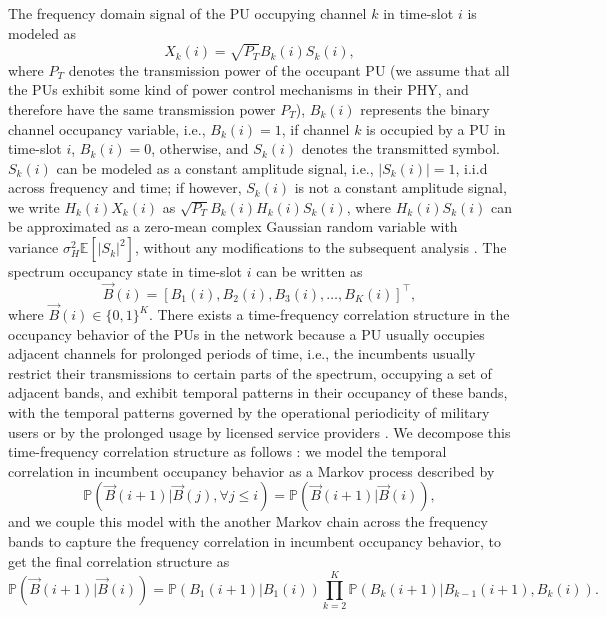 \documentclass[12pt, draftcls, onecolumn]{IEEEtran}
\begin{document}
The frequency domain signal of the PU occupying channel $k$ in time-slot $i$ is modeled as
\begin{equation}\label{3}
    X_{k}(i)=\sqrt{P_{T}}B_{k}(i)S_{k}(i),
\end{equation}
where $P_{T}$ denotes the transmission power of the occupant PU (we assume that all the PUs exhibit some kind of power control mechanisms in their PHY, and therefore have the same transmission power $P_{T}$), $B_{k}(i)$ represents the binary channel occupancy variable, i.e., $B_{k}(i){=}1$, if channel $k$ is occupied by a PU in time-slot $i$, $B_{k}(i){=}0$, otherwise, and $S_{k}(i)$ denotes the transmitted symbol. $S_{k}(i)$ can be modeled as a constant amplitude signal, i.e., $|S_{k}(i)|{=}1$, i.i.d across frequency and time; if however, $S_{k}(i)$ is not a constant amplitude signal, we write $H_{k}(i)X_{k}(i)$ as $\sqrt{P_{T}}B_{k}(i)H_{k}(i)S_{k}(i)$, where $H_{k}(i)S_{k}(i)$ can be approximated as a zero-mean complex Gaussian random variable with variance $\sigma_{H}^{2}\mathbb{E}[|S_{k}|^{2}]$, without any modifications to the subsequent analysis \cite{WCL:paper}. The spectrum occupancy state in time-slot $i$ can be written as
\begin{equation}\label{4}
    \vec{B}(i)=[B_{1}(i),B_{2}(i),B_{3}(i),\dots,B_{K}(i)]^{\intercal},
\end{equation}
where $\vec{B}(i){\in}\{0,1\}^{K}$. There exists a time-frequency correlation structure in the occupancy behavior of the PUs in the network because a PU usually occupies adjacent channels for prolonged periods of time, i.e., the incumbents usually restrict their transmissions to certain parts of the spectrum, occupying a set of adjacent bands, and exhibit temporal patterns in their occupancy of these bands, with the temporal patterns governed by the operational periodicity of military users or by the prolonged usage by licensed service providers \cite{WCL:12}. We decompose this time-frequency correlation structure as follows \cite{WCL:paper}: we model the temporal correlation in incumbent occupancy behavior as a Markov process described by
\begin{equation}\label{5}
    \mathbb{P}(\vec{B}(i+1)|\vec{B}(j),\forall j \leq i)=\mathbb{P}(\vec{B}(i+1)|\vec{B}(i)),
\end{equation}
and we couple this model with the another Markov chain across the frequency bands to capture the frequency correlation in incumbent occupancy behavior, to get the final correlation structure as
\begin{equation}\label{6}
    \mathbb{P}(\vec{B}(i+1)|\vec{B}(i))=\mathbb{P}(B_{1}(i+1)|B_{1}(i))\prod_{k=2}^{K}\mathbb{P}(B_{k}(i+1)|B_{k-1}(i+1),B_{k}(i)).
\end{equation}
\end{document}
